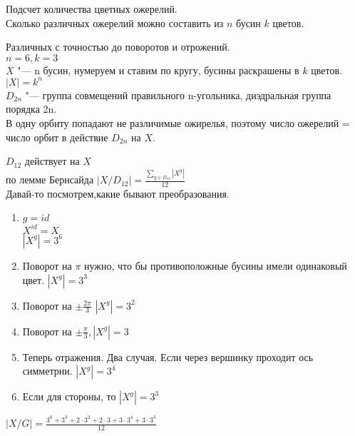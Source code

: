 \begin{exmp}
Подсчет количества цветных ожерелий.\\
Сколько различных ожерелий можно составить из
$n$ бусин $k$ цветов.

Различных с точностью до поворотов и отрожений.\\ 
$n = 6, k = 3$\\

$X$ "--- n бусин, нумеруем и ставим по кругу, бусины раскрашены в $k$ цветов.\\
$|X| = k^n$\\

$D_{2n}$ "--- группа совмещений правильного n-угольника, 
диэдральная группа порядка 2n.\\
В одну орбиту попадают не различимые ожирелья, поэтому 
число ожерелий = число орбит в действие $D_{2n}$ на $X$.

$D_{12}$ действует на $X$\\
по лемме Бернсайда $|X/D_{12}| = \frac{\sum_{g \in D_{12}}|X^g|}{12}$\\

Давай-то посмотрем,какие бывают преобразования. 
\begin{enumerate}
\item $g = id$\\
$X^{id} = X$\\
$|X^g| = 3^6$\\
\item 
Поворот на $\pi$ нужно, что бы противоположные бусины имели одинаковый цвет. $|X^g| = 3^3$
\item
Поворот на $\pm \frac{2\pi}{3}$  $|X^g| = 3^2$\\
\item
Поворот на $\pm \frac{\pi}{3}, |X^g| = 3$
\item
Теперь отражения.
Два случая. Если через вершинку проходит ось симметрии. 
$|X^g| = 3^4$ \\
\item
Если для стороны, то 
$|X^g| = 3^3$\\
\end{enumerate}

$|X/G| = \frac{3^6 + 3^3 + 2\cdot 3^2 + 2\cdot 3 + 3 \cdot 3^4 + 3 \cdot 3^3}{12}$
\end{exmp}
